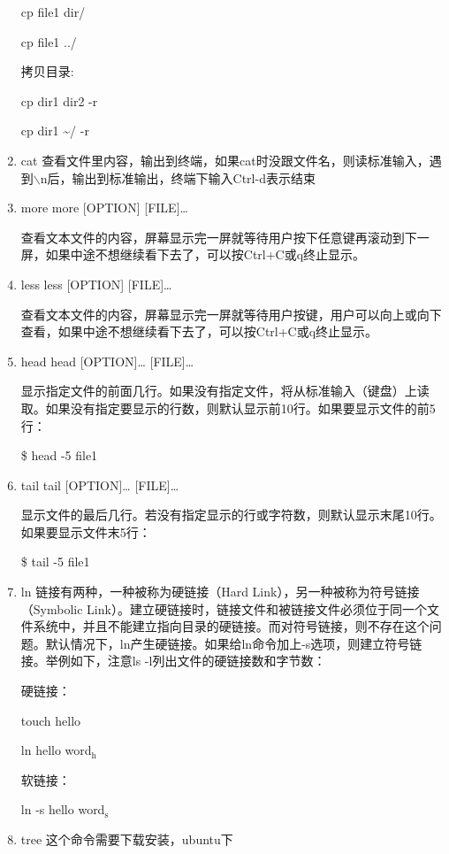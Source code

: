 \documentclass[11pt]{article}
\begin{document}
\begin{enumerate}
cp file1 dir/

cp file1 ../

拷贝目录:

cp dir1 dir2 -r

cp dir1 \textasciitilde{}/ -r

\item cat
\label{sec-1-1-2-14}
查看文件里内容，输出到终端，如果cat时没跟文件名，则读标准输入，遇到$\backslash$n后，输出到标准输出，终端下输入Ctrl-d表示结束

\item more
\label{sec-1-1-2-15}
more [OPTION] [FILE]\ldots{}

查看文本文件的内容，屏幕显示完一屏就等待用户按下任意键再滚动到下一屏，如果中途不想继续看下去了，可以按Ctrl+C或q终止显示。 

\item less
\label{sec-1-1-2-16}
less [OPTION] [FILE]\ldots{}

查看文本文件的内容，屏幕显示完一屏就等待用户按键，用户可以向上或向下查看，如果中途不想继续看下去了，可以按Ctrl+C或q终止显示。 
\item head
\label{sec-1-1-2-17}
head [OPTION]\ldots{} [FILE]\ldots{}

显示指定文件的前面几行。如果没有指定文件，将从标准输入（键盘）上读取。如果没有指定要显示的行数，则默认显示前10行。如果要显示文件的前5行： 

\$ head -5 file1

\item tail
\label{sec-1-1-2-18}
tail [OPTION]\ldots{} [FILE]\ldots{}

显示文件的最后几行。若没有指定显示的行或字符数，则默认显示末尾10行。如果要显示文件末5行： 

\$ tail -5 file1

\item ln
\label{sec-1-1-2-19}
链接有两种，一种被称为硬链接（Hard Link），另一种被称为符号链接（Symbolic Link）。建立硬链接时，链接文件和被链接文件必须位于同一个文件系统中，并且不能建立指向目录的硬链接。而对符号链接，则不存在这个问题。默认情况下，ln产生硬链接。如果给ln命令加上-s选项，则建立符号链接。举例如下，注意ls -l列出文件的硬链接数和字节数： 

硬链接：

touch hello

ln  hello word$_{\text{h}}$

软链接：

ln -s hello word$_{\text{s}}$

\item tree
\label{sec-1-1-2-20}
这个命令需要下载安装，ubuntu下


\end{enumerate}
\end{document}
